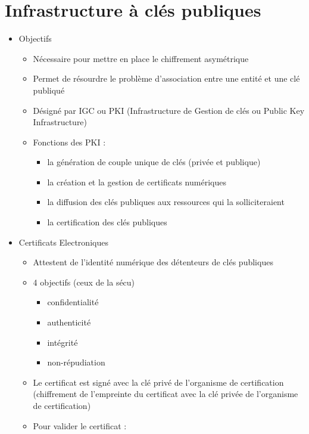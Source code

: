 \documentclass[a4paper]{article}
\begin{document}
\section{Infrastructure à clés publiques}
\begin{itemize}[label=\textbullet, font=\Large]
    \item Objectifs
    \begin{itemize}[label=, font=\scriptsize]
        \item Nécessaire pour mettre en place le chiffrement asymétrique
        \item Permet de résourdre le problème d'association entre une entité et une clé publiqué
        \item Désigné par IGC ou PKI (Infrastructure de Gestion de clés ou Public Key Infrastructure)
        \item Fonctions des PKI :
        \begin{itemize}
            \item la génération de couple unique de clés (privée et publique)
            \item la création et la gestion de certificats numériques
            \item la diffusion des clés publiques aux ressources qui la solliciteraient
            \item la certification des clés publiques
        \end{itemize}
    \end{itemize}
    \item Certificats Electroniques
    \begin{itemize}[label=, font=\scriptsize]
        \item Attestent de l'identité numérique des détenteurs de clés publiques
        \item 4 objectifs (ceux de la sécu)
        \begin{itemize}
            \item confidentialité
            \item authenticité
            \item intégrité
            \item non-répudiation
        \end{itemize}
        \item Le certificat est signé avec la clé privé de l'organisme de certification (chiffrement de l’empreinte du certificat avec la clé privée de l’organisme de certification)
        \item Pour valider le certificat :

\end{itemize}
\end{itemize}
\end{document}
